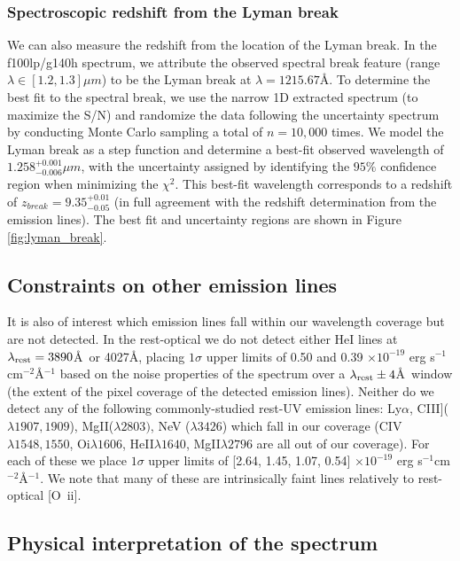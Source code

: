\documentclass[sn-mathphys]{sn-jnl}%
\theoremstyle{thmstyleone}%
\theoremstyle{thmstyletwo}%
\theoremstyle{thmstylethree}%
\newcommand{\Oii}{[O~{\sc ii}]}
\begin{document}
\subsubsection{Spectroscopic redshift from the Lyman break}\label{sec:lyman_break_redshift}
We can also measure the redshift from the location of the Lyman break. In the f100lp/g140h spectrum, we attribute the observed spectral break feature (range $\lambda\in[1.2,1.3] \mu m$) to be the Lyman break at $\lambda=1215.67$\AA. To determine the best fit to the spectral break, we use the narrow 1D extracted spectrum (to maximize the S/N) and randomize the data following the uncertainty spectrum by conducting Monte Carlo sampling a total of $n=10,000$ times. We model the Lyman break as a step function and determine a best-fit observed wavelength of $1.258^{+0.001}_{-0.006}\mu m$, 
with the uncertainty assigned by identifying the $95\%$ confidence region when minimizing the $\chi^2$. This best-fit wavelength corresponds to a redshift of $z_{break}=9.35_{-0.05}^{+0.01}$ (in full agreement with the redshift determination from the emission lines). The best fit and uncertainty regions are shown in Figure \ref{fig:lyman_break}.

\subsection{Constraints on other emission lines}

It is also of interest which emission lines fall within our wavelength coverage but are not detected. In the rest-optical we do not detect either HeI lines at $\lambda_{\rm rest}=3890$\AA\ or 4027\AA, placing $1\sigma$ upper limits of 0.50 and 0.39 $\times10^{-19}$ erg s$^{-1} $cm$^{-2}$\AA$^{-1}$ based on the noise properties of the spectrum over a $\lambda_{\rm rest}\pm4$\AA\ window (the extent of the pixel coverage of the detected emission lines). Neither do we detect any of the following commonly-studied rest-UV emission lines: Ly$\alpha$, CIII]($\lambda1907,1909$), MgII($\lambda2803)$, NeV ($\lambda3426$) which fall in our coverage (CIV$\lambda1548, 1550$, Oi$\lambda1606$, HeII$\lambda1640$, MgII$\lambda2796$ are all out of our coverage). For each of these we place $1\sigma$ upper limits of [2.64, 1.45, 1.07, 0.54] $\times10^{-19}$ erg s$^{-1} $cm$^{-2}$\AA$^{-1}$. We note that many of these are intrinsically faint lines relatively to rest-optical \Oii.


\subsection{Physical interpretation of the spectrum}\label{sec:spec_interp}
\end{document}
